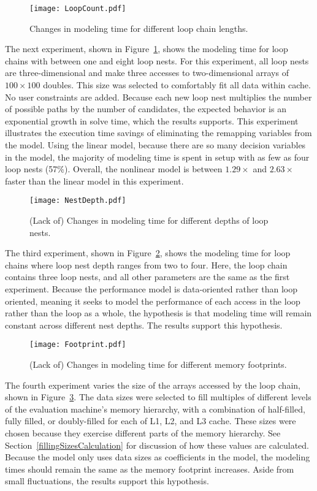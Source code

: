 \begin{figure}
\texttt{[image: LoopCount.pdf]}
\caption{Changes in modeling time for different loop chain lengths.}\label{LoopCount}
\end{figure}
The next experiment, shown in Figure~\ref{LoopCount}, shows the modeling time for loop chains with between one and eight loop nests.
For this experiment, all loop nests are three-dimensional and make three accesses to two-dimensional arrays of $100\times100$ doubles. 
This size was selected to comfortably fit all data within cache.
No user constraints are added.
Because each new loop nest multiplies the number of possible paths by the number of candidates, the expected behavior is an exponential growth in solve time, which the results supports.
This experiment illustrates the execution time savings of eliminating the remapping variables from the model.
Using the linear model, because there are so many decision variables in the model, the majority of modeling time is spent in setup with as few as four loop nests (57\%).
Overall, the nonlinear model is between $1.29\times$ and $2.63\times$ faster than the linear model in this experiment.

\begin{figure}
	\texttt{[image: NestDepth.pdf]}
	\caption{(Lack of) Changes in modeling time for different depths of loop nests.}\label{NestDepth}
\end{figure}
The third experiment, shown in Figure~\ref{NestDepth}, shows the modeling time for loop chains where loop nest depth ranges from two to four.
Here, the loop chain contains three loop nests, and all other parameters are the same as the first experiment.
Because the performance model is data-oriented rather than loop oriented, meaning it seeks to model the performance of each access in the loop rather than the loop as a whole, the hypothesis is that modeling time will remain constant across different nest depths.
The results support this hypothesis.

\begin{figure}
\texttt{[image: Footprint.pdf]}
\caption{(Lack of) Changes in modeling time for different memory footprints.}\label{Footprint}
\end{figure}
The fourth experiment varies the size of the arrays accessed by the loop chain, shown in Figure~\ref{Footprint}.
The data sizes were selected to fill multiples of different levels of the evaluation machine's memory hierarchy, with a combination of half-filled, fully filled, or doubly-filled for each of L1, L2, and L3 cache.
These sizes were chosen because they exercise different parts of the memory hierarchy.
See Section~\ref{fillingSizesCalculation} for discussion of how these values are calculated.
Because the model only uses data sizes as coefficients in the model, the modeling times should remain the same as the memory footprint increases.
Aside from small fluctuations, the results support this hypothesis.


